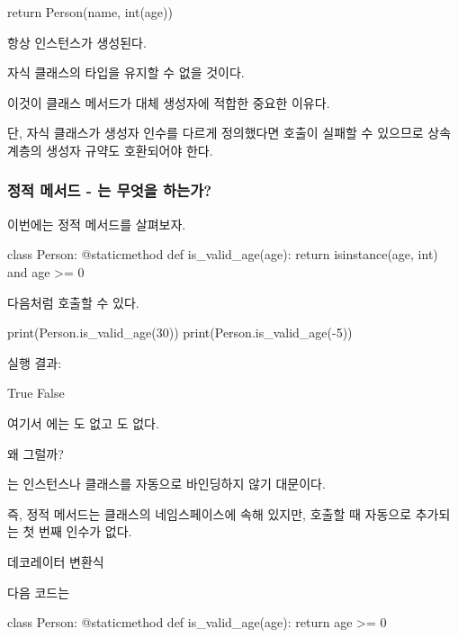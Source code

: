 \begin{dhkcode}
return Person(name, int(age))
\end{dhkcode}

항상  인스턴스가 생성된다.

자식 클래스의 타입을 유지할 수 없을 것이다.

이것이 클래스 메서드가 대체 생성자에 적합한 중요한 이유다.

단, 자식 클래스가 생성자 인수를 다르게 정의했다면  호출이 실패할 수 있으므로 상속 계층의 생성자 규약도 호환되어야 한다.

\subsubsection{정적 메서드 - 는 무엇을 하는가?}

이번에는 정적 메서드를 살펴보자.

\begin{dhkcode}
class Person:
    @staticmethod
    def is_valid_age(age):
        return isinstance(age, int) and age >= 0
\end{dhkcode}

다음처럼 호출할 수 있다.

\begin{dhkcode}
print(Person.is_valid_age(30))
print(Person.is_valid_age(-5))
\end{dhkcode}

실행 결과:

\begin{dhkzsh}
True
False
\end{dhkzsh}

여기서 에는 도 없고 도 없다.

왜 그럴까?

는 인스턴스나 클래스를 자동으로 바인딩하지 않기 대문이다.

즉, 정적 메서드는 클래스의 네임스페이스에 속해 있지만, 호출할 때 자동으로 추가되는 첫 번째 인수가 없다.

\begin{dhknote}
\begin{dhksmry}[centered]
데코레이터 변환식
\end{dhksmry}
\end{dhknote}

다음 코드는

\begin{dhkcode}
class Person:
    @staticmethod
    def is_valid_age(age):
        return age >= 0
\end{dhkcode}

